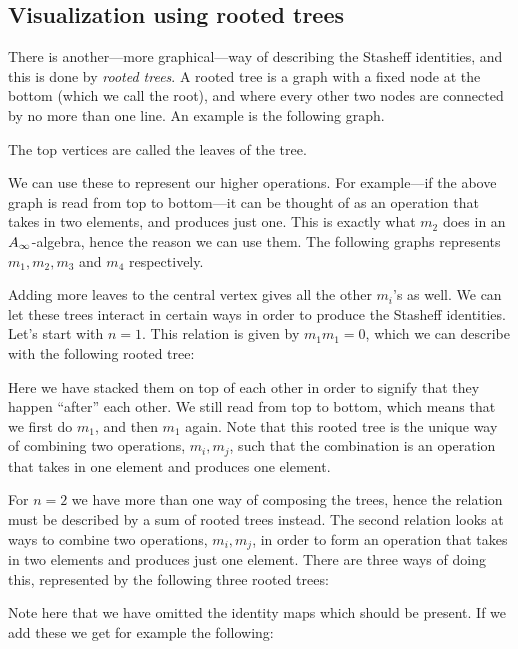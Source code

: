 
\subsection{Visualization using rooted trees}


There is another---more graphical---way of describing the Stasheff identities, and this is done by \emph{rooted trees}. A rooted tree is a graph with a fixed node at the bottom (which we call the root), and where every other two nodes are connected by no more than one line. An example is the following graph.



The top vertices are called the leaves of the tree. 

We can use these to represent our higher operations. For example---if the above graph is read from top to bottom---it can be thought of as an operation that takes in two elements, and produces just one. This is exactly what $m_2$ does in an $A_{\infty}$-algebra, hence the reason we can use them. The following graphs represents $m_1, m_2, m_3$ and $m_4$ respectively. 



Adding more leaves to the central vertex gives all the other $m_i$'s as well. We can let these trees interact in certain ways in order to produce the Stasheff identities. Let's start with $n=1$. This relation is given by $m_1 m_1=0$, which we can describe with the following rooted tree:


Here we have stacked them on top of each other in order to signify that they happen ``after'' each other. We still read from top to bottom, which means that we first do $m_1$, and then $m_1$ again. Note that this rooted tree is the unique way of combining two operations, $m_i, m_j$, such that the combination is an operation that takes in one element and produces one element. 

For $n=2$ we have more than one way of composing the trees, hence the relation must be described by a sum of rooted trees instead. The second relation looks at ways to combine two operations, $m_i, m_j$, in order to form an operation that takes in two elements and produces just one element. There are three ways of doing this, represented by the following three rooted trees:


Note here that we have omitted the identity maps which should be present. If we add these we get for example the following:


